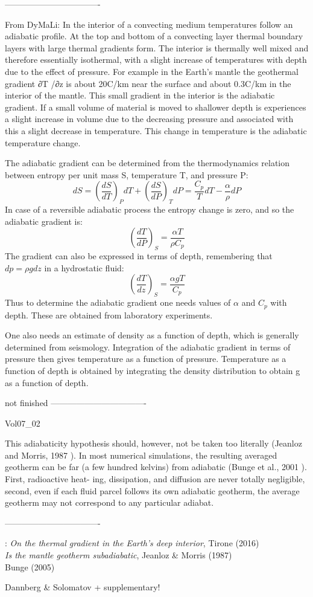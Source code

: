 ----------------------------------

From DyMaLi: In the interior of a convecting medium temperatures follow an adiabatic profile. 
At the top and bottom of a convecting layer thermal boundary layers with large thermal gradients form. 
The interior is thermally well mixed and therefore essentially isothermal, with a slight increase 
of temperatures with depth due to the effect of pressure.
For example in the Earth’s mantle the geothermal gradient ∂T /∂z is about 20C/km near the 
surface and about 0.3C/km in the interior of the mantle. This small gradient in the 
interior is the adiabatic gradient. If a small
volume of material is moved to shallower depth is experiences a slight increase in volume 
due to the decreasing pressure and associated with this a slight decrease in temperature. 
This change in temperature is the adiabatic temperature change.

The adiabatic gradient can be determined from the thermodynamics relation between entropy per unit mass S,
temperature T, and pressure P:
\[
dS = \left( \frac{dS}{dT}\right)_P dT +  \left( \frac{dS}{dP}\right)_T dP
=
\frac{C_p }{T} dT - \frac{\alpha}{\rho} dP
\]
In case of a reversible adiabatic process the entropy change is zero, and so the adiabatic gradient is:
\[
\left( \frac{dT}{dP}\right)_S = \frac{\alpha T}{\rho C_p} 
\]
The gradient can also be expressed in terms of depth, remembering that $d p = \rho gdz$ 
in a hydrostatic fluid:
\[
\left( \frac{dT}{dz}\right)_S = \frac{\alpha g T}{C_p} 
\]
Thus to determine the adiabatic gradient one needs values of $\alpha$ 
and $C_p$ with depth. These are obtained from laboratory experiments.

One also needs an estimate of density as a function of depth, which is generally determined
from seismology. 
Integration of the adiabatic gradient in terms of pressure then gives
temperature as a function of pressure. 
Temperature as a function of depth is obtained by integrating the density
distribution to obtain g as a function of depth.

not finished
----------------------------------

Vol07\_02


This adiabaticity hypothesis should, however, not
be taken too literally (Jeanloz and Morris, 1987 \cite{jemo87}). In
most numerical simulations, the resulting averaged
geotherm can be far (a few hundred kelvins) from
adiabatic (Bunge et al., 2001 \cite{burm01}). First, radioactive heat-
ing, dissipation, and diffusion are never totally
negligible, second, even if each fluid parcel follows
its own adiabatic geotherm, the average geotherm
may not correspond to any particular adiabat.




----------------------------------

\Literature: 
{\it On the thermal gradient in the Earth’s deep interior}, Tirone (2016) \cite{tiro16} \\
{\it Is the mantle geotherm subadiabatic}, Jeanloz \& Morris (1987) \cite{jemo87} \\

Bunge (2005) \cite{bung05}

Dannberg \& Solomatov \cite{daso15} + supplementary!

